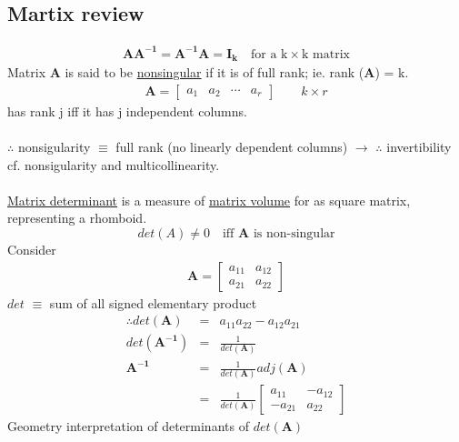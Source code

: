 \subsection{Martix review}
\begin{eqnarray*}
\boldsymbol{AA^{-1}}=\boldsymbol{A^{-1}A}=\boldsymbol{I_{k}}\quad \text{for a k}\times\text{k matrix}
\end{eqnarray*}
Matrix $\boldsymbol{A}$ is said to be \underline{nonsingular} if it is of full rank; ie. rank ($\boldsymbol{A}$) = k.
\begin{eqnarray*}
\boldsymbol{A} = \begin{bmatrix} a_{1} & a_{2} & \cdots & a_{r} \end{bmatrix}\qquad k\times r
\end{eqnarray*}
has rank j iff it has j independent columns.\\
\\
$\therefore$ nonsigularity $\equiv$ full rank (no linearly dependent columns) $\to$ $\therefore$ invertibility\\
cf. nonsigularity and multicollinearity.\\
\\
\underline{Matrix determinant} is a measure of \underline{matrix volume} for as square matrix, representing a rhomboid.
\[det(A) \neq 0 \quad \text{iff }\boldsymbol{A}\text{ is non-singular}\]
Consider \begin{eqnarray*}
\boldsymbol{A}=\begin{bmatrix}
a_{11} & a_{12}\\
a_{21} & a_{22}\end{bmatrix}
\end{eqnarray*}
$det$ $\equiv$ sum of all signed elementary product
\begin{eqnarray*}
\therefore det (\boldsymbol{A}) &=& a_{11}a_{22}-a_{12}a_{21}\\
det(\boldsymbol{A^{-1}}) &=& \frac{1}{det(\boldsymbol{A})}\\
\boldsymbol{A^{-1}} &=& \frac{1}{det(\boldsymbol{A})}adj(\boldsymbol{A})\\
&=&\frac{1}{det(\boldsymbol{A})}\begin{bmatrix}
a_{11} & -a_{12}\\
-a_{21} & a_{22}\end{bmatrix}
\end{eqnarray*}
Geometry interpretation of determinants of $det(\boldsymbol{A})$\\
